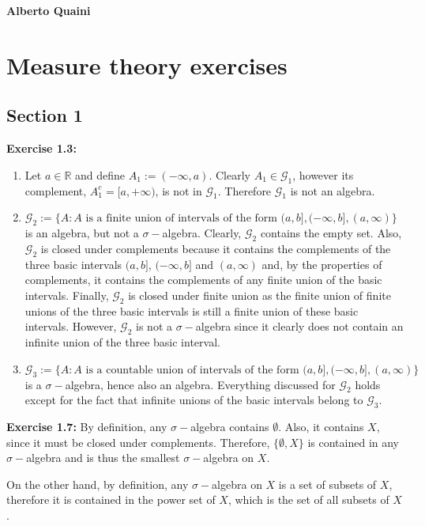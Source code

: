 \documentclass[11.5pt, letterpaper, bibtotoc,
    tablecaptionabove, figurecaptionabove]{article}
\begin{document}
\textbf{Alberto Quaini}

\section*{Measure theory exercises}

\subsection*{Section 1}

\textbf{Exercise 1.3:}
\begin{enumerate}
\item
Let $a\in\mathbb R$ and define $A_1:=(-\infty, a)$. 
Clearly $A_1\in\mathcal G_1$, however its complement, $A_1^c = [a, +\infty)$, is not in $\mathcal G_1$.
Therefore $\mathcal G_1$ is not an algebra.

\item
$\mathcal G_2 := \{A: A \text{ is a finite union of intervals of the form } (a, b], (-\infty, b], (a, \infty)\}$ 
is an algebra, but not a $\sigma-$algebra.
Clearly, $\mathcal G_2$ contains the empty set.
Also, $\mathcal G_2$ is closed under complements because it contains the complements of the three basic intervals 
$(a, b]$, $(-\infty, b]$ and $(a, \infty)$ and, by the properties of complements, 
it contains the complements of any finite union of the basic intervals.
Finally, $\mathcal G_2$ is closed under finite union as the finite union of finite unions 
of the three basic intervals is still a finite union of these basic intervals.
However, $\mathcal G_2$ is not a $\sigma-$algebra since it clearly does not contain an infinite union 
of the three basic interval.

\item
$\mathcal G_3 := \{A: A \text{ is a countable union of intervals of the form } (a, b], (-\infty, b], (a, \infty)\}$ is a $\sigma-$algebra, hence also an algebra.
Everything discussed for $\mathcal G_2$ holds except for the fact that infinite unions of the basic intervals belong to $\mathcal G_3$. 

\end{enumerate}

\textbf{Exercise 1.7:}
By definition, any $\sigma-$algebra contains $\emptyset$.
Also, it contains $X$, since it must be closed under complements.
Therefore, $\{\emptyset, X\}$ is contained in any $\sigma-$algebra and is thus the smallest $\sigma-$algebra on $X$.

On the other hand, by definition, any $\sigma-$algebra on $X$ is a set of subsets of $X$, 
therefore it is contained in the power set of $X$, which is the set of all subsets of $X$.
\end{document}
